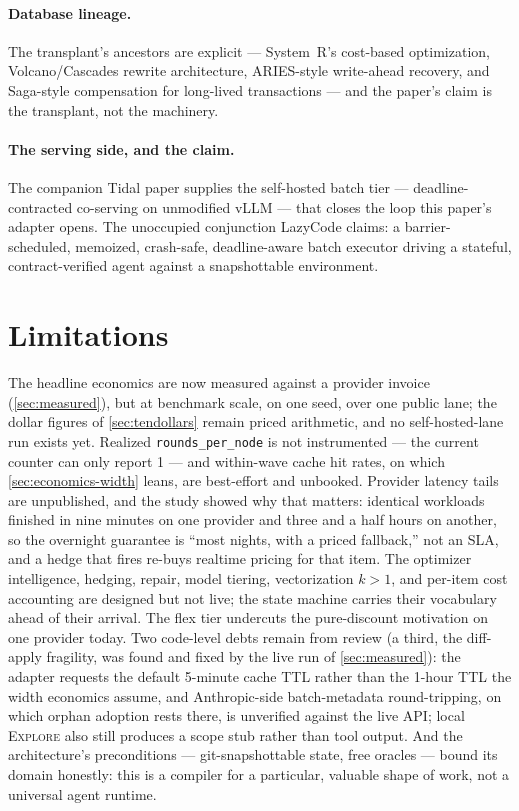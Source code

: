 \documentclass[11pt]{article}
\begin{document}
\paragraph{Database lineage.} The transplant's ancestors are explicit --- System~R's cost-based optimization, Volcano/Cascades rewrite architecture, ARIES-style write-ahead recovery, and Saga-style compensation for long-lived transactions --- and the paper's claim is the transplant, not the machinery.

\paragraph{The serving side, and the claim.} The companion Tidal paper supplies the self-hosted batch tier --- deadline-contracted co-serving on unmodified vLLM --- that closes the loop this paper's adapter opens. The unoccupied conjunction LazyCode claims: a barrier-scheduled, memoized, crash-safe, deadline-aware batch executor driving a stateful, contract-verified agent against a snapshottable environment.

\section{Limitations}
\label{sec:limitations}

{\sloppy
The headline economics are now measured against a provider invoice (\cref{sec:measured}), but at benchmark scale, on one seed, over one public lane; the dollar figures of \cref{sec:tendollars} remain priced arithmetic, and no self-hosted-lane run exists yet. Realized \texttt{rounds\_per\_node} is not instrumented --- the current counter can only report 1 --- and within-wave cache hit rates, on which \cref{sec:economics-width} leans, are best-effort and unbooked. Provider latency tails are unpublished, and the study showed why that matters: identical workloads finished in nine minutes on one provider and three and a half hours on another, so the overnight guarantee is ``most nights, with a priced fallback,'' not an SLA, and a hedge that fires re-buys realtime pricing for that item. The optimizer intelligence, hedging, repair, model tiering, vectorization $k{>}1$, and per-item cost accounting are designed but not live; the state machine carries their vocabulary ahead of their arrival. The flex tier undercuts the pure-discount motivation on one provider today. Two code-level debts remain from review (a third, the diff-apply fragility, was found and fixed by the live run of \cref{sec:measured}): the adapter requests the default 5-minute cache TTL rather than the 1-hour TTL the width economics assume, and Anthropic-side batch-metadata round-tripping, on which orphan adoption rests there, is unverified against the live API; local \textsc{Explore} also still produces a scope stub rather than tool output. And the architecture's preconditions --- git-snapshottable state, free oracles --- bound its domain honestly: this is a compiler for a particular, valuable shape of work, not a universal agent runtime.\par}
\end{document}
